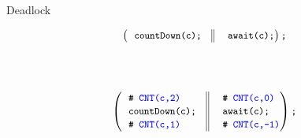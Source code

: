 \begin{frame}{Deadlock}
\begin{center}
\begin{small}
\[
{
\left(
\begin{tabular}{ l@{\extracolsep{\fill}}  || l@{\extracolsep{\fill}} }
\code{countDown(c);~~} &~~\code{await(c);}\\
\end{tabular}\right)\code{;}
}
\]

\end{small}
\end{center}
\pause
\pause
\begin{center}
\begin{small}
\\
\\
\[
{
\left(
\begin{tabular}{ l@{\extracolsep{\fill}}  || l@{\extracolsep{\fill}} }
\code{\CSPEC{CNT(c,2)}} &~~\code{\CSPEC{CNT(c,0)}}\\
\code{countDown(c);~~} &~~\code{await(c);}\\
\code{\CSPEC{CNT(c,1)}} &~~\code{\CSPEC{CNT(c,-1)}}\\
\end{tabular}\right)\code{;}
}
\]

\\
\end{small}
\end{center}
\end{frame}
